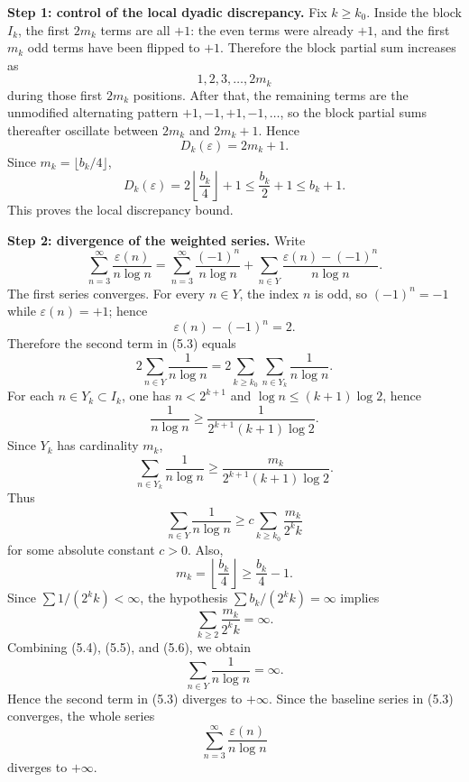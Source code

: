 \smallskip
\noindent\textbf{Step 1: control of the local dyadic discrepancy.}
Fix \(k\ge k_0\).  Inside the block \(I_k\), the first \(2m_k\) terms are all \(+1\): the even terms were already \(+1\), and the first \(m_k\) odd terms have been flipped to \(+1\).  Therefore the block partial sum increases as
\[
1,2,3,\dots,2m_k
\]
during those first \(2m_k\) positions.  After that, the remaining terms are the unmodified alternating pattern \(+1,-1,+1,-1,\dots\), so the block partial sums thereafter oscillate between \(2m_k\) and \(2m_k+1\).  Hence
\[
D_k(\varepsilon)=2m_k+1.
\]
Since \(m_k=\lfloor b_k/4\rfloor\),
\[
D_k(\varepsilon)=2\left\lfloor \frac{b_k}{4}\right\rfloor+1
\le \frac{b_k}{2}+1
\le b_k+1.
\tag{5.2}
\]
This proves the local discrepancy bound.

\smallskip
\noindent\textbf{Step 2: divergence of the weighted series.}
Write
\[
\sum_{n=3}^{\infty}\frac{\varepsilon(n)}{n\log n}
=
\sum_{n=3}^{\infty}\frac{(-1)^n}{n\log n}
+
\sum_{n\in Y}\frac{\varepsilon(n)-(-1)^n}{n\log n}.
\tag{5.3}
\]
The first series converges.  For every \(n\in Y\), the index \(n\) is odd, so \((-1)^n=-1\) while \(\varepsilon(n)=+1\); hence
\[
\varepsilon(n)-(-1)^n = 2.
\]
Therefore the second term in (5.3) equals
\[
2\sum_{n\in Y}\frac{1}{n\log n}
=2\sum_{k\ge k_0}\sum_{n\in Y_k}\frac{1}{n\log n}.
\tag{5.4}
\]
For each \(n\in Y_k\subset I_k\), one has \(n<2^{k+1}\) and \(\log n\le (k+1)\log 2\), hence
\[
\frac{1}{n\log n}
\ge \frac{1}{2^{k+1}(k+1)\log 2}.
\]
Since \(Y_k\) has cardinality \(m_k\),
\[
\sum_{n\in Y_k}\frac{1}{n\log n}
\ge \frac{m_k}{2^{k+1}(k+1)\log 2}.
\]
Thus
\[
\sum_{n\in Y}\frac{1}{n\log n}
\ge c\sum_{k\ge k_0}\frac{m_k}{2^k k}
\tag{5.5}
\]
for some absolute constant \(c>0\).  Also,
\[
m_k=\left\lfloor \frac{b_k}{4}\right\rfloor \ge \frac{b_k}{4}-1.
\]
Since \(\sum 1/(2^k k)<\infty\), the hypothesis \(\sum b_k/(2^k k)=\infty\) implies
\[
\sum_{k\ge 2}\frac{m_k}{2^k k}=\infty.
\tag{5.6}
\]
Combining (5.4), (5.5), and (5.6), we obtain
\[
\sum_{n\in Y}\frac{1}{n\log n}=\infty.
\]
Hence the second term in (5.3) diverges to \(+\infty\).  Since the baseline series in (5.3) converges, the whole series
\[
\sum_{n=3}^{\infty}\frac{\varepsilon(n)}{n\log n}
\]
diverges to \(+\infty\).

